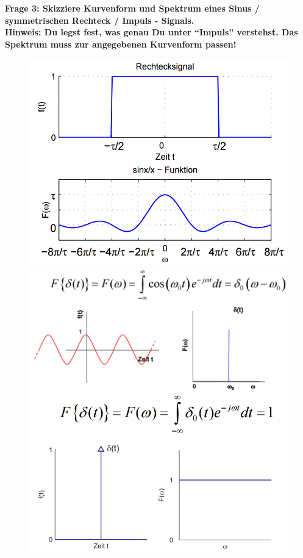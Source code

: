 \documentclass[11pt,a4paper]{scrartcl}
\begin{document}
\newpage
\textbf{Frage 3: Skizziere Kurvenform und Spektrum eines Sinus / symmetrischen Rechteck / Impuls - Signals.\\
Hinweis: Du legst fest, was genau Du unter "`Impuls"' verstehst. Das Spektrum muss zur angegebenen Kurvenform passen!}\\
\begin{figure}[H]
  \includegraphics[width=\linewidth]{rechteck.png}
\endminipage\hfill
{}
  \includegraphics[width=\linewidth]{sinus.png}
\endminipage\hfill
{}
  \includegraphics[width=\linewidth]{impuls.png}
\endminipage
\end{figure}
\end{document}
